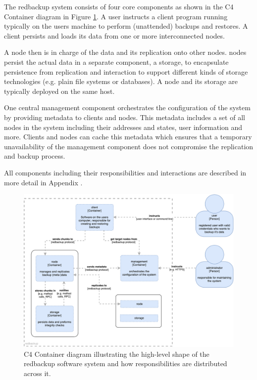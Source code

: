 The redbackup system consists of four core components as shown in the C4 Container diagram in Figure \ref{fig:c4-container}. A \gls{user} instructs a \gls{client} program running typically on the users machine to perform (unattended) backups and restores.  A client persists and loads its data from one or more interconnected \glspl{node}.

A \gls{node} then is in charge of the data and its replication onto other nodes. \Glspl{node} persist the actual data in a separate component, a \gls{storage}, to encapsulate persistence from replication and interaction to support different kinds of storage technologies (e.g. plain file systems or databases). A \gls{node} and its \gls{storage} are typically deployed on the same host.

One central \gls{management} component orchestrates the configuration of the system by providing metadata to clients and nodes. This metadata includes a set of all nodes in the system including their addresses and states, user information and more. Clients and nodes can cache this metadata which ensures that a temporary unavailability of the management component does not compromise the replication and backup process.

All components including their responsibilities and interactions are described in more detail in Appendix .

\begin{figure}[h]
	\centering
	\includegraphics[width=1\linewidth]{resources/c4-container}
	\caption[C4 Container diagram]{C4 Container diagram illustrating the high-level shape of the redbackup software system and how responsibilities are distributed across it.}
	\label{fig:c4-container}
\end{figure}

